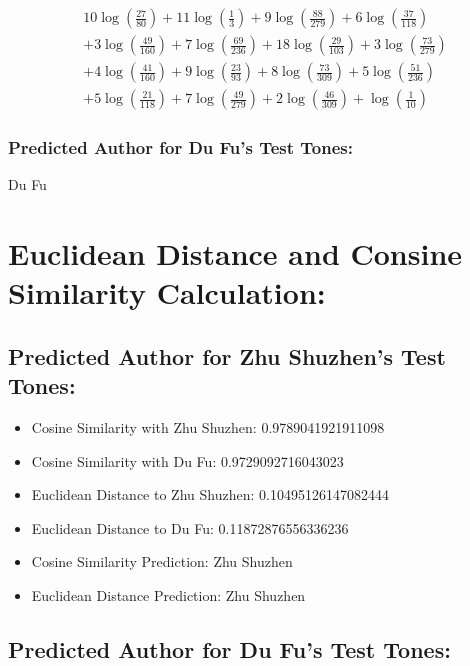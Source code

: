 \documentclass[12pt]{article}
\begin{document}
\begin{align*}
& 10 \log\left(\frac{27}{80}\right) + 11 \log\left(\frac{1}{3}\right) + 9 \log\left(\frac{88}{279}\right) + 6 \log\left(\frac{37}{118}\right) \\
& + 3 \log\left(\frac{49}{160}\right) + 7 \log\left(\frac{69}{236}\right) + 18 \log\left(\frac{29}{103}\right) + 3 \log\left(\frac{73}{279}\right) \\
& + 4 \log\left(\frac{41}{160}\right) + 9 \log\left(\frac{23}{93}\right) + 8 \log\left(\frac{73}{309}\right) + 5 \log\left(\frac{51}{236}\right) \\
& + 5 \log\left(\frac{21}{118}\right) + 7 \log\left(\frac{49}{279}\right) + 2 \log\left(\frac{46}{309}\right) + \log\left(\frac{1}{10}\right)
\end{align*}

\subsubsection*{Predicted Author for Du Fu's Test Tones: }
Du Fu

\section*{Euclidean Distance and Consine Similarity Calculation: }

\subsection*{Predicted Author for Zhu Shuzhen's Test Tones:}

\begin{itemize}
    \item Cosine Similarity with Zhu Shuzhen: 0.9789041921911098
    \item Cosine Similarity with Du Fu: 0.9729092716043023
    \item Euclidean Distance to Zhu Shuzhen: 0.10495126147082444
    \item Euclidean Distance to Du Fu: 0.11872876556336236
    \item Cosine Similarity Prediction: Zhu Shuzhen
    \item Euclidean Distance Prediction: Zhu Shuzhen
\end{itemize}

\subsection*{Predicted Author for Du Fu's Test Tones:}
\end{document}
